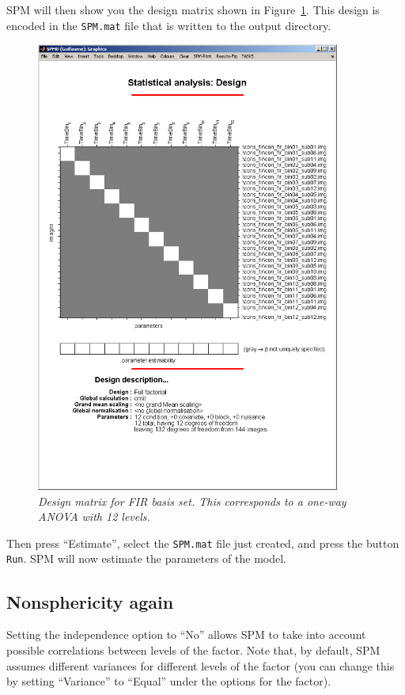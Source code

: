 SPM will then show you the design matrix shown in Figure~\ref{fir_design}. This design is encoded in the \texttt{SPM.mat} file that is written to the output directory.
\begin{figure}
\begin{center}
\includegraphics[width=100mm]{faces_group/fir_design}
\caption{\em Design matrix for FIR basis set. This corresponds to a one-way ANOVA with 12 levels. \label{fir_design}}
\end{center}
\end{figure}
Then press ``Estimate'', select the \texttt{SPM.mat} file just created, and press the button \texttt{Run}.
SPM will now estimate the parameters of the model.

\subsection{Nonsphericity again}

Setting the independence option to ``No'' allows SPM to take into account possible correlations between levels of the factor. Note that, by default, SPM assumes different variances for different levels of the factor (you can change this by setting ``Variance'' to ``Equal'' under the options for the factor). 

